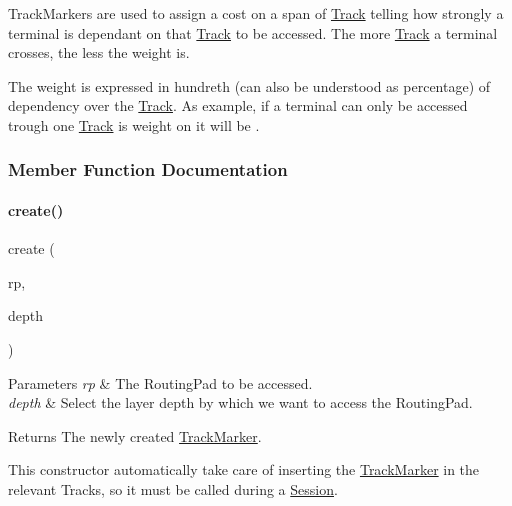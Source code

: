 Track\+Markers are used to assign a cost on a span of \hyperlink{classKite_1_1Track}{Track} telling how strongly a terminal is dependant on that \hyperlink{classKite_1_1Track}{Track} to be accessed. The more \hyperlink{classKite_1_1Track}{Track} a terminal crosses, the less the weight is.

The weight is expressed in hundreth (can also be understood as percentage) of dependency over the \hyperlink{classKite_1_1Track}{Track}. As example, if a terminal can only be accessed trough one \hyperlink{classKite_1_1Track}{Track} is weight on it will be {}. 

\subsubsection{Member Function Documentation}
\mbox{\label{classKite_1_1TrackMarker_ab44a3705a23cba53cf68357de5673c04}} 
\paragraph{\texorpdfstring{create()}{create()}}
{\footnotesize\ttfamily create (\begin{DoxyParamCaption}\item[{\textbf{ Routing\+Pad} $\ast$}]{rp,  }\item[{size\+\_\+t}]{depth }\end{DoxyParamCaption})\hspace{0.3cm}{\ttfamily [static]}}


\begin{DoxyParams}{Parameters}
{\em rp} & The Routing\+Pad to be accessed. \\
\hline
{\em depth} & Select the layer depth by which we want to access the Routing\+Pad. \\
\hline
\end{DoxyParams}
\begin{DoxyReturn}{Returns}
The newly created \hyperlink{classKite_1_1TrackMarker}{Track\+Marker}.
\end{DoxyReturn}
This constructor automatically take care of inserting the \hyperlink{classKite_1_1TrackMarker}{Track\+Marker} in the relevant Tracks, so it must be called during a \hyperlink{classKite_1_1Session}{Session}. \mbox{\label{classKite_1_1TrackMarker_a692492374623a5c6096b2c4a51190359}} 
